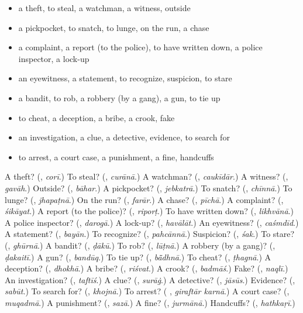 \begin{itemize}
\raggedright
  \item a theft, to steal, a watchman, a witness, outside
  \item a pickpocket, to snatch, to lunge, on the run, a chase
  \item a complaint, a report (to the police), to have written down, a police inspector, a lock-up
  \item an eyewitness, a statement, to recognize, suspicion, to stare
  \item a bandit, to rob, a robbery (by a gang), a gun, to tie up
  \item to cheat, a deception, a bribe, a crook, fake
  \item an investigation, a clue, a detective, evidence, to search for
  \item to arrest, a court case, a punishment, a fine, handcuffs
\end{itemize}

\begin{tcolorbox}[breakable,colback=teal!4,colframe=teal!35!black,title={Before you move on}]
A theft? (\textbf{}, \emph{corī}.) To steal? (\textbf{}, \emph{curānā}.) A watchman? (\textbf{}, \emph{caukīdār}.) A witness? (\textbf{}, \emph{gavāh}.) Outside? (\textbf{}, \emph{bāhar}.) A pickpocket? (\textbf{}, \emph{jebkatrā}.) To snatch? (\textbf{}, \emph{chīnnā}.) To lunge? (\textbf{}, \emph{jhapaṭnā}.) On the run? (\textbf{}, \emph{farār}.) A chase? (\textbf{}, \emph{pīchā}.) A complaint? (\textbf{}, \emph{śikāyat}.) A report (to the police)? (\textbf{}, \emph{riporṭ}.) To have written down? (\textbf{}, \emph{likhvānā}.) A police inspector? (\textbf{}, \emph{darogā}.) A lock-up? (\textbf{}, \emph{havālāt}.) An eyewitness? (\textbf{}, \emph{caśmdīd}.) A statement? (\textbf{}, \emph{bayān}.) To recognize? (\textbf{}, \emph{pahcānnā}.) Suspicion? (\textbf{}, \emph{śak}.) To stare? (\textbf{}, \emph{ghūrnā}.) A bandit? (\textbf{}, \emph{ḍākū}.) To rob? (\textbf{}, \emph{lūṭnā}.) A robbery (by a gang)? (\textbf{}, \emph{ḍakaitī}.) A gun? (\textbf{}, \emph{bandūq}.) To tie up? (\textbf{}, \emph{bā̃dhnā}.) To cheat? (\textbf{}, \emph{ṭhagnā}.) A deception? (\textbf{}, \emph{dhokhā}.) A bribe? (\textbf{}, \emph{riśvat}.) A crook? (\textbf{}, \emph{badmāś}.) Fake? (\textbf{}, \emph{naqlī}.) An investigation? (\textbf{}, \emph{taftīś}.) A clue? (\textbf{}, \emph{surāġ}.) A detective? (\textbf{}, \emph{jāsūs}.) Evidence? (\textbf{}, \emph{sabūt}.) To search for? (\textbf{}, \emph{khojnā}.) To arrest? (\textbf{ }, \emph{giraftār karnā}.) A court case? (\textbf{}, \emph{muqadmā}.) A punishment? (\textbf{}, \emph{sazā}.) A fine? (\textbf{}, \emph{jurmānā}.) Handcuffs? (\textbf{}, \emph{hathkaṛī}.)
\end{tcolorbox}
